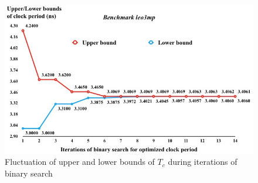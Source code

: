 \begin{figure}
    \centering
    \includegraphics[width=0.8\columnwidth]{leo3mp_Tc.png} %
    \caption{Fluctuation of upper and lower bounds of $T_{c}$ during iterations of binary search}
    \label{fig:Tc}
\end{figure}